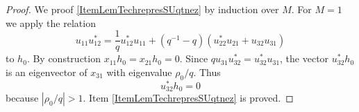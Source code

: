 \begin{proof}
    We proof \ref{ItemLemTechrepresSUqtnez} by induction over \( M\). For \( M=1\) we apply the relation
    \begin{equation}
        u_{11}u_{12}^*=\frac{1}{ q }u_{12}^*u_{11}+(q^{-1}-q)(u_{22}^*u_{21}+u_{32}u_{31})
    \end{equation}
    to \( h_0\). By construction \( x_{11}h_0=x_{21}h_0=0\). Since \( qu_{31}u_{32}^*=u_{32}^*u_{31}\), the vector \( u_{32}^*h_0\) is an eigenvector of \( x_{31}\) with eigenvalue \( \rho_0/q\). Thus
    \begin{equation}
        u_{32}^*h_0=0
    \end{equation}
    because \( | \rho_0/q |>1\). Item \ref{ItemLemTechrepresSUqtnez} is proved.

\end{proof}


